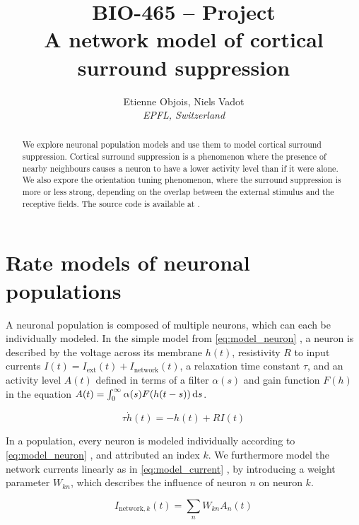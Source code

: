 \documentclass[10pt,conference,compsocconf,a4paper]{IEEEtran}
\newcommand*{\shortautoref}[1]{%
	\begingroup
	\def\equationautorefname{\textsc{Eq.}}%
	\def\tableautorefname{\textsc{Tab.}}%
	\def\figureautorefname{\textsc{Fig.}}%
	\autoref{#1}%
	\endgroup
}
\begin{document}
\title{BIO-465 -- Project\\A network model of cortical surround suppression}

\author{
	Etienne Objois, Niels Vadot\\
	\textit{EPFL, Switzerland}
}

\maketitle

\begin{abstract}
	We explore neuronal population models and use them to model cortical surround suppression.
	Cortical surround suppression is a phenomenon where the presence of nearby neighbours causes a neuron to have a lower activity level than if it were alone.
	We also expore the orientation tuning phenomenon, where the surround suppression is more or less strong, depending on the overlap between the external stimulus and the receptive fields.
	The source code is available at \cite{cs456_source}.
\end{abstract}

\section{Rate models of neuronal populations}

	A neuronal population is composed of multiple neurons, which can each be individually modeled. In the simple model from \shortautoref{eq:model_neuron}, a neuron is described by the voltage across its membrane $h(t)$, resistivity $R$ to input currents $I(t) = I_{\text{ext}}(t) + I_{\text{network}}(t)$, a relaxation time constant $\tau$, and an activity level $A(t)$ defined in terms of a filter $\alpha(s)$ and gain function $F(h)$ in the equation $A(t) = \int_0^\infty \alpha(s) F(h(t-s)) \dif{s}$.

	\begin{equation} \label{eq:model_neuron}
		\tau \dot h(t) = -h(t) + R I(t)
	\end{equation}

	In a population, every neuron is modeled individually according to \shortautoref{eq:model_neuron}, and attributed an index $k$. We furthermore model the network currents linearly as in \shortautoref{eq:model_current}, by introducing a weight parameter $W_{kn}$, which describes the influence of neuron $n$ on neuron $k$.

	\begin{equation} \label{eq:model_current}
		I_{\text{network},k}(t) = \sum_n W_{kn} A_n(t)
	\end{equation}
\end{document}
